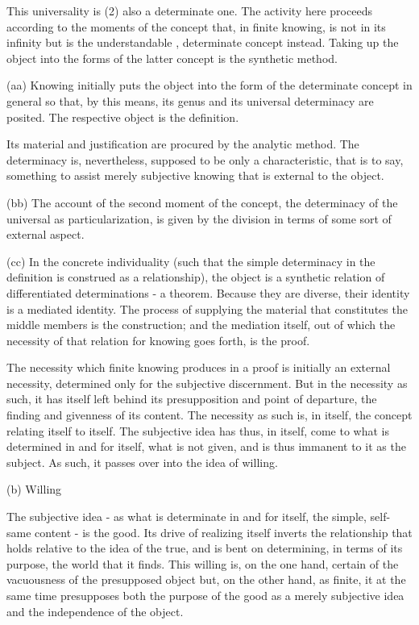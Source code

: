 This universality is (2) also a determinate one.
The activity here proceeds according to the moments of
the concept that, in finite knowing, is not in its infinity
but is the understandable , determinate concept instead.
Taking up the object into the forms of
the latter concept is the synthetic method.

(aa) Knowing initially puts the object into the form of
the determinate concept in general so that, by this means,
its genus and its universal determinacy are posited.
The respective object is the definition.

Its material and justification are procured by the analytic method.
The determinacy is, nevertheless, supposed to be only a characteristic,
that is to say, something to assist merely subjective knowing
that is external to the object.

(bb) The account of the second moment of the concept,
the determinacy of the universal as particularization,
is given by the division in terms of some sort of external aspect.

(cc) In the concrete individuality (such that the simple determinacy in
the definition is construed as a relationship),
the object is a synthetic relation of differentiated determinations - a theorem.
Because they are diverse, their identity is a mediated identity.
The process of supplying the material that constitutes
the middle members is the construction;
and the mediation itself, out of which the necessity of
that relation for knowing goes forth, is the proof.

The necessity which finite knowing produces in a proof
is initially an external necessity,
determined only for the subjective discernment.
But in the necessity as such, it has itself left behind its presupposition
and point of departure, the finding and givenness of its content.
The necessity as such is, in itself, the concept relating itself to itself.
The subjective idea has thus, in itself, come to what is determined in and for itself,
what is not given, and is thus immanent to it as the subject.
As such, it passes over into the idea of willing.

(b) Willing

The subjective idea - as what is determinate in and for itself,
the simple, self-same content - is the good.
Its drive of realizing itself inverts the relationship
that holds relative to the idea of the true, and is bent on determining,
in terms of its purpose, the world that it finds.
This willing is, on the one hand, certain of the vacuousness of the presupposed object
but, on the other hand, as finite, it at the same time presupposes
both the purpose of the good as a merely subjective idea
and the independence of the object.

